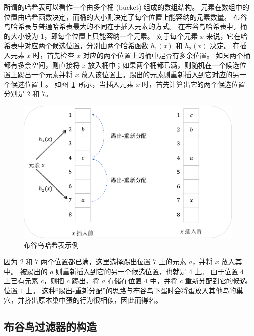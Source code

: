 所谓的哈希表可以看作一个由多个桶 (bucket) 组成的数组结构。
元素在数组中的位置由哈希函数决定，而桶的大小则决定了每个位置上能容纳的元素数量。
布谷鸟哈希表与普通哈希表最大的不同在于插入元素的方式。
在布谷鸟哈希表中，桶的大小设为 $1$，即每个位置上只能容纳一个元素。
对于每个元素 $x$ 来说，它在哈希表中对应两个候选位置，分别由两个哈希函数 $h_1(x)$ 和 $h_2(x)$ 决定。
在插入元素 $x$ 时，首先检查 $x$ 对应的两个位置上的桶中是否有多余位置。
如果两个桶都有多余空间，则直接将 $x$ 放入桶中；如果两个桶都已满，则随机在一个候选位置上踢出一个元素并将 $x$ 放入该位置上。踢出的元素则重新插入到它对应的另一个候选位置上。
如图~\ref{fig:cuckoo_example}~所示，当插入元素 $x$ 时，首先计算出它的两个候选位置分别是 $2$ 和 $7$。
\begin{figure}[ht]
  \centering
  \includegraphics[width=\textwidth]{figures/ckh_exp.pdf}
  \caption{布谷鸟哈希表示例}
  \label{fig:cuckoo_example}
\end{figure}
因为 $2$ 和 $7$ 两个位置都已满，这里选择踢出位置 $7$ 上的元素 $a$，并将 $x$ 放入其中。
被踢出的 $a$ 则重新插入到它的另一个候选位置，也就是 $4$ 上。
由于位置 $4$ 上已有元素 $c$，则把 $c$ 踢出，将 $a$ 存储在位置 $4$ 中，并将 $c$ 重新分配到它的候选位置 $1$ 上。
这种``踢出-重新分配''的思路与布谷鸟下蛋时会将蛋放入其他鸟的巢穴，并挤出原本巢中蛋的行为很相似，因此而得名。

\subsection{布谷鸟过滤器的构造}

